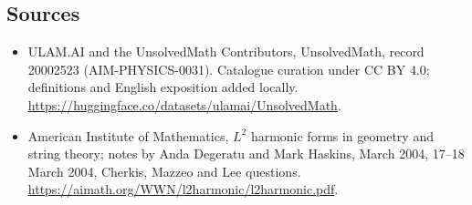 \documentclass[11pt]{article}
\begin{document}
\subsection{Sources}
\begin{itemize}
\item[\hypertarget{source:20002523:1}{S1}] ULAM.AI and the UnsolvedMath Contributors, UnsolvedMath, record 20002523 (AIM-PHYSICS-0031). Catalogue curation under CC BY 4.0; definitions and English exposition added locally.
\url{https://huggingface.co/datasets/ulamai/UnsolvedMath}.
\item[\hypertarget{source:20002523:2}{S2}] American Institute of Mathematics, $L^2$ harmonic forms in geometry and string theory; notes by Anda Degeratu and Mark Haskins, March 2004, 17–18 March 2004, Cherkis, Mazzeo and Lee questions.
\url{https://aimath.org/WWN/l2harmonic/l2harmonic.pdf}.
\end{itemize}
\label{end:20002523}
\end{document}
